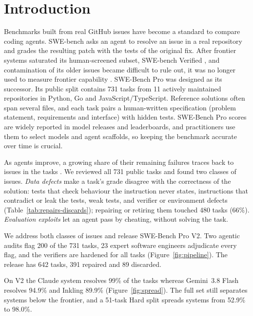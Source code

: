 \section{Introduction}

Benchmarks built from real GitHub issues have become a standard to compare coding agents. SWE-bench \citep{jimenez2024swebench} asks an agent to resolve an issue in a real repository and grades the resulting patch with the tests of the original fix. After frontier systems saturated its human-screened subset, SWE-bench Verified \citep{openai2024verified}, and contamination of its older issues became difficult to rule out, it was no longer used to measure frontier capability \citep{openai2026swebenchverified}. SWE-Bench Pro \citep{deng2025swebenchpro} was designed as its successor. Its public split contains 731 tasks from 11 actively maintained repositories in Python, Go and JavaScript/TypeScript. Reference solutions often span several files, and each task pairs a human-written specification (problem statement, requirements and interface) with hidden tests. SWE-Bench Pro scores are widely reported in model releases and leaderboards, and practitioners use them to select models and agent scaffolds, so keeping the benchmark accurate over time is crucial.

As agents improve, a growing share of their remaining failures traces back to issues in the tasks \citep{nadgir2026life}. We reviewed all 731 public tasks and found two classes of issues. \emph{Data defects} make a task's grade disagree with the correctness of the solution: tests that check behaviour the instruction never states, instructions that contradict or leak the tests, weak tests, and verifier or environment defects (Table~\ref{tab:repairs-discards}); repairing or retiring them touched 480 tasks (66\%). \emph{Evaluation exploits} let an agent pass by cheating, without solving the task.


We address both classes of issues and release SWE-Bench Pro V2. Two agentic audits flag 200 of the 731 tasks, 23 expert software engineers adjudicate every flag, and the verifiers are hardened for all tasks (Figure~\ref{fig:pipeline}). The release has 642 tasks, 391 repaired and 89 discarded.

On V2 the Claude system resolves 99\% of the tasks whereas Gemini~3.8 Flash resolves 94.9\% and Inkling 89.9\% (Figure~\ref{fig:spread}). The full set still separates systems below the frontier, and a 51-task Hard split spreads systems from 52.9\% to 98.0\%. 

